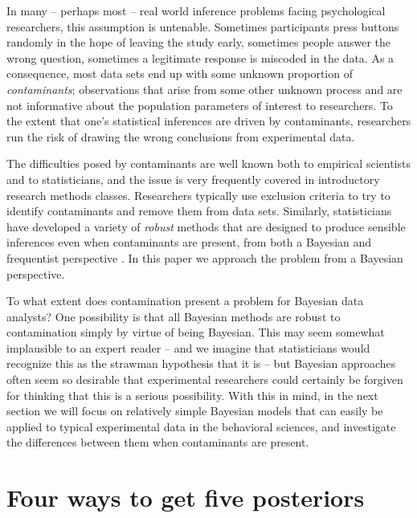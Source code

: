 \documentclass[doc]{apa6}
\begin{document}
{In many -- perhaps most -- real world inference problems facing psychological researchers, this assumption is untenable. Sometimes participants press buttons randomly in the hope of leaving the study early, sometimes people answer the wrong question, sometimes a legitimate response is miscoded in the data. As a consequence, most data sets end up with some unknown proportion of {\it contaminants}; observations that arise from some other unknown process and are not informative about the population parameters of interest to researchers. To the extent that one's statistical inferences are driven by contaminants, researchers run the risk of drawing the wrong conclusions from experimental data.

The difficulties posed by contaminants are well known both to empirical scientists and to statisticians, and the issue is very frequently covered in introductory research methods classes. Researchers typically use exclusion criteria to try to identify contaminants and remove them from data sets. Similarly, statisticians have developed a variety of {\it robust} methods that are designed to produce sensible inferences even when contaminants are present, from both a Bayesian \parencite{wang_general_2015,berger_overview_1994} and frequentist perspective \parencite{huber_robust_1964,huber_robust_2009}. In this paper we approach the problem from a Bayesian perspective.

To what extent does contamination present a problem for Bayesian data analysts? One possibility is that all Bayesian methods are robust to contamination simply by virtue of being Bayesian. This may seem somewhat implausible to an expert reader -- and we imagine that statisticians would recognize this as the strawman hypothesis that it is -- but Bayesian approaches often seem so desirable that experimental researchers could certainly be forgiven for thinking that this is a serious possibility. With this in mind, in the next section we will focus on relatively simple Bayesian models that can easily be applied to typical experimental data in the behavioral sciences, and investigate the differences between them when contaminants are present.

\section{Four ways to get five posteriors}

}
\end{document}
